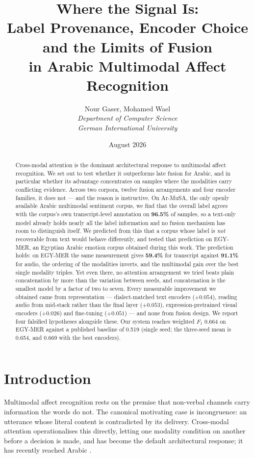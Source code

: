 \documentclass[12pt, a4paper]{article}
\title{\textbf{Where the Signal Is:\\
Label Provenance, Encoder Choice and the Limits of Fusion\\
in Arabic Multimodal Affect Recognition}}
\author{Nour Gaser, Mohamed Wael \\
\textit{Department of Computer Science} \\
\textit{German International University}}
\date{August 2026}
\begin{document}
\maketitle

\begin{abstract}
Cross-modal attention is the dominant architectural response to multimodal
affect recognition. We set out to test whether it outperforms late fusion for
Arabic, and in particular whether its advantage concentrates on samples where
the modalities carry conflicting evidence. Across two corpora, twelve fusion
arrangements and four encoder families, it does not --- and the reason is
instructive. On Ar-MuSA, the only openly available Arabic multimodal sentiment
corpus, we find that the overall label agrees with the corpus's own
transcript-level annotation on \textbf{96.5\%} of samples, so a text-only model
already holds nearly all the label information and no fusion mechanism has room
to distinguish itself. We predicted from this that a corpus whose label is
\emph{not} recoverable from text would behave differently, and tested that
prediction on EGY-MER, an Egyptian Arabic emotion corpus obtained during this
work. The prediction holds: on EGY-MER the same measurement gives
\textbf{59.4\%} for transcript against \textbf{91.1\%} for audio, the ordering
of the modalities inverts, and the multimodal gain over the best single modality
triples. Yet even there, no attention arrangement we tried beats plain
concatenation by more than the variation between seeds, and concatenation is the
smallest model by a factor of two to seven. Every measurable
improvement we obtained came from representation --- dialect-matched text
encoders ($+0.054$), reading audio from mid-stack rather than the final layer
($+0.053$), expression-pretrained visual encoders ($+0.026$) and fine-tuning
($+0.051$) --- and none from fusion design. We report four falsified hypotheses
alongside these. Our system reaches weighted $F_1$ 0.664 on EGY-MER against a
published baseline of 0.519 (single seed; the three-seed mean is 0.654, and 0.669
with the best encoders).
\end{abstract}

\section{Introduction}
\label{sec:intro}

Multimodal affect recognition rests on the premise that non-verbal channels
carry information the words do not. The canonical motivating case is
incongruence: an utterance whose literal content is contradicted by its
delivery. Cross-modal attention \citep{Tsai2019} operationalises this directly,
letting one modality condition on another before a decision is made, and has
become the default architectural response; it has recently reached Arabic
\citep{Cheikhi2026}.
\end{document}
